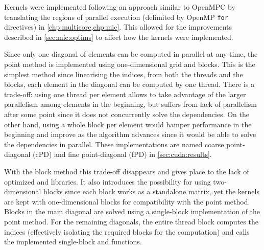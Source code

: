 \documentclass[../thesis]{subfiles}
\begin{document}
	Kernels were implemented following an approach similar to OpenMPC by translating the regions of parallel execution (delimited by OpenMP \texttt{for} directives) in \cref{chp:multicore,chp:mic}. This allowed for the improvements described in \cref{sec:mic:optims} to affect how the kernels were implemented.

	Since only one diagonal of elements can be computed in parallel at any time, the point method is implemented using one-dimensional grid and blocks. This is the simplest method since linearising the indices, from both the threads and the blocks, each element in the diagonal can be computed by one thread. There is a trade-off: using one thread per element allows to take advantage of the larger parallelism among elements in the beginning, but suffers from lack of parallelism after some point since it does not concurrently solve the dependencies. On the other hand, using a whole block per element would hamper performance in the beginning and improve as the algorithm advances since it would be able to solve the dependencies in parallel. These implementations are named coarse point-diagonal (cPD) and fine point-diagonal (fPD) in \cref{sec:cuda:results}.

	With the block method this trade-off disappears and gives place to the lack of optimized \blas and \lapack libraries. It also introduces the possibility for using two-dimensional blocks since each block works as a standalone matrix, yet the kernels are kept with one-dimensional blocks for compatibility with the point method. Blocks in the main diagonal are solved using a single-block implementation of the point method. For the remaining diagonals, the entire thread block computes the indices (effectively isolating the required blocks for the computation) and calls the implemented single-block \blas and \lapack functions.
\end{document}
